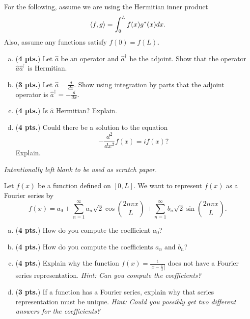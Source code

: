 \documentclass[12pt]{amsbook}
\begin{document}
\newpage
\begin{problem}
For the following, assume we are using the Hermitian inner product
\[
\left\langle f, g\right\rangle = \int_0^L f(x)g^*(x)dx.
\]
Also, assume any functions satisfy $f(0)=f(L)$.
\begin{enumerate}[(a)]
	\item (\textbf{4 pts.}) Let $\hat{a}$ be an operator and $\hat{a}^\dagger$ be the adjoint. Show that the operator $\hat{a}\hat{a}^\dagger$ is Hermitian.
	\vspace*{4cm}
	
	\item (\textbf{3 pts.}) Let $\hat{a} = \frac{d}{dx}$. Show using integration by parts that the adjoint operator is $\hat{a}^\dagger  = -\frac{d}{dx}$.
	\vspace*{5cm}
	
	\item (\textbf{4 pts.}) Is $\hat{a}$ Hermitian? Explain.
	\vspace*{4cm}
	
	\item (\textbf{4 pts.}) Could there be a solution to the equation
	\[
	-\frac{d^2}{dx^2} f(x) = i f(x)?
	\]
	Explain.
\end{enumerate}
\end{problem}

\newpage
\emph{Intentionally left blank to be used as scratch paper.}\\


\newpage
\begin{problem} Let $f(x)$ be a function defined on $[0,L]$.  We want to represent $f(x)$ as a Fourier series by
\[
f(x) = a_0 + \sum_{n=1}^\infty a_n \sqrt{2} \cos\left(\frac{2n \pi x}{L}\right) + \sum_{n=1}^\infty b_n \sqrt{2} \sin\left(\frac{2n\pi x}{L}\right).
\]
\begin{enumerate}[(a)]
	\item (\textbf{4 pts.}) How do you compute the coefficient $a_0$?
	\vspace*{4cm}
	
	\item (\textbf{4 pts.}) How do you compute the coefficients $a_n$ and $b_n$?
	\vspace*{4cm}
	
	\item (\textbf{4 pts.}) Explain why the function $f(x) = \frac{1}{\left|x-\frac{L}{2}\right|}$ does not have a Fourier series representation. \emph{Hint: Can you compute the coefficients?}
	\vspace*{4cm}
	
	\item (\textbf{3 pts.}) If a function has a Fourier series, explain why that series representation must be unique. \emph{Hint: Could you possibly get two different answers for the coefficients?}
\end{enumerate}
\end{problem}
\end{document}

